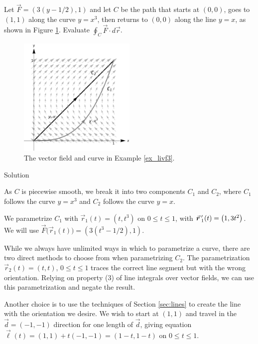 \begin{example}\label{ex_livf3}
Let $\vec F = \left( 3(y-1/2),1\right)$ and let $C$ be the path that starts at $(0,0)$, goes to $(1,1)$ along the curve $y=x^3$, then returns to $(0,0)$ along the line $y=x$, as shown in Figure \ref{fig_double_30}. Evaluate $\oint_C \vec F\cdot d\vec r$.


\begin{figure}[H]
	\begin{center}
			\includegraphics[width=0.5\textwidth]{fig_double_30}
	\caption{The vector field and curve in Example \ref{ex_livf3}.}
	\label{fig_double_30}
	\end{center}
\end{figure}


Solution 

As $C$ is piecewise smooth, we break it into two components $C_1$ and $C_2$, where $C_1$ follows the curve $y=x^3$ and $C_2$ follows the curve $y=x$. 

We parametrize $C_1$ with $\vec r_1(t) = \left( t, t^3\right)$ on $0\leq t\leq 1$, with $\vrp_1(t) = \left( 1,3t^2\right)$. We will use \linebreak $\vec F\big(\vec r_1(t)\big) = \left( 3(t^3-1/2),1\right)$.

While we always have unlimited ways in which to parametrize a curve, there are two direct methods to choose from when parametrizing $C_2$. The parametrization $\vec r_2(t)=\left( t,t\right)$, $0\leq t\leq 1$ traces the correct line segment but with the wrong orientation. Relying on property (3) of line integrals over vector fields, we can use this parametrization and negate the result.

Another choice is to use the techniques of Section \ref{sec:lines} to create the line with the orientation we desire. We wish to start at $( 1,1)$ and travel in the $\vec d = \left( -1,-1\right)$ direction for one length of $\vec d$, giving equation $\vec \ell(t) = \left( 1,1\right) + t\left( -1,-1\right) = \left( 1-t,1-t\right)$ on $0\leq t\leq 1$.


\end{example}
